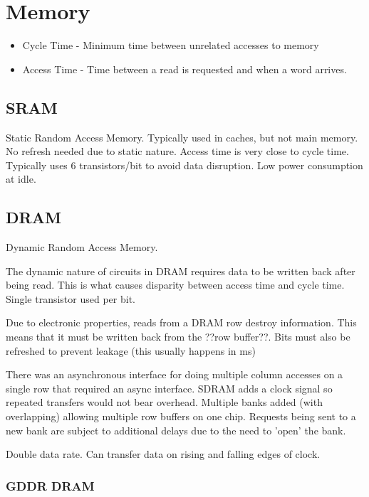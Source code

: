 \documentclass{article}
\begin{document}
\section{Memory}

\begin{itemize}
    \item Cycle Time - Minimum time between unrelated accesses to memory
    \item Access Time -  Time between a read is requested and when a word arrives.
\end{itemize}


\subsection{SRAM}

Static Random Access Memory. Typically used in caches, but not main memory. No refresh needed due to static nature. Access time is very close to cycle time. Typically uses 6 transistors/bit to avoid data disruption. Low power consumption at idle. 

\subsection{DRAM}

Dynamic Random Access Memory.

The dynamic nature of circuits in DRAM  requires data to be written back after being read. This is what causes disparity between access time and cycle time. Single transistor used per bit. 

Due to electronic properties, reads from a DRAM row destroy information. This means that it must be written back from the ??row buffer??. Bits must also be refreshed to prevent leakage (this usually happens in ms)


There was an asynchronous interface for doing multiple column accesses on a single row that required an async interface. SDRAM adds a clock signal so repeated transfers would not bear overhead. Multiple banks added (with overlapping) allowing multiple row buffers on one chip. Requests being sent to a new bank are subject to additional delays due to the need to 'open' the bank. 



Double data rate. Can transfer data on rising and falling edges of clock.

\subsubsection{GDDR DRAM}
\end{document}
